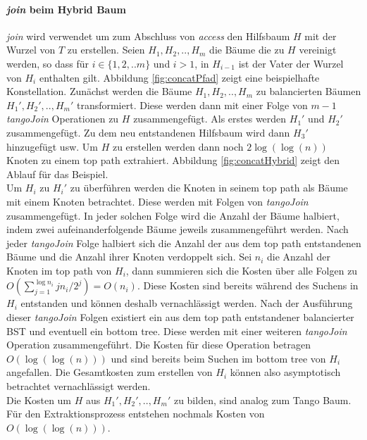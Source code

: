 \documentclass[a4paper,12pt]{article}
\begin{document}
\paragraph{\textit{join} beim Hybrid Baum}
\textit{join} wird verwendet um zum Abschluss von \textit{access} den Hilfsbaum $H$ mit der Wurzel von $T$ zu erstellen. Seien $H_1,H_2,..,H_m$ die Bäume die zu $H$ vereinigt werden, so dass für $i \in \{1,2,..m\}$ und $i > 1$, in $H_{i-1}$ ist der Vater der Wurzel von $H_i$ enthalten gilt. Abbildung \ref{fig:concatPfad} zeigt eine beispielhafte Konstellation. Zunächst werden die Bäume $H_1,H_2,..,H_m$ zu balancierten Bäumen $H_1',H_2',..,H_m'$ transformiert. Diese werden dann mit einer Folge von $m-1$ \textit{tangoJoin} Operationen zu $H$ zusammengefügt. Als erstes werden $H_1'$ und $H_2'$ zusammengefügt. Zu dem neu entstandenen Hilfsbaum wird dann $H_3'$ hinzugefügt usw.  Um $H$ zu erstellen werden dann noch $2\log\left(\log\left(n\right)\right)$ Knoten zu einem top path extrahiert. Abbildung \ref{fig:concatHybrid} zeigt den Ablauf für das Beispiel.\\
Um $H_i$ zu $H_i'$ zu überführen werden die Knoten in seinem top path als Bäume mit einem Knoten betrachtet. Diese werden mit Folgen von  \textit{tangoJoin} zusammengefügt. In jeder solchen Folge wird die Anzahl der Bäume halbiert, indem zwei aufeinanderfolgende Bäume jeweils zusammengeführt werden. Nach jeder \textit{tangoJoin} Folge halbiert sich die Anzahl der aus dem top path entstandenen Bäume und die Anzahl ihrer Knoten verdoppelt sich. Sei $n_i$ die Anzahl der Knoten im top path von $H_i$, dann summieren sich die Kosten über alle Folgen zu $O\left(\sum_{j = 1}^{\log n_i} j n_i / 2^j\right) = O\left(n_i\right)$. Diese Kosten sind bereits während des Suchens in $H_i$ entstanden und können deshalb vernachlässigt werden. Nach der Ausführung dieser \textit{tangoJoin} Folgen existiert ein aus dem top path entstandener balancierter BST und eventuell ein bottom tree. Diese werden mit einer weiteren \textit{tangoJoin} Operation zusammengeführt. Die Kosten für diese Operation betragen $O\left(\log\left(\log\left(n\right)\right)\right)$ und sind bereits beim Suchen im bottom tree von $H_i$ angefallen. Die Gesamtkosten zum erstellen von $H_i$ können also asymptotisch betrachtet vernachlässigt werden. \\
Die Kosten um $H$ aus  $H_1',H_2',..,H_m'$ zu bilden, sind analog zum Tango Baum. Für den Extraktionsprozess entstehen nochmals Kosten von $O\left(\log\left(\log\left(n\right)\right)\right)$.
\end{document}
